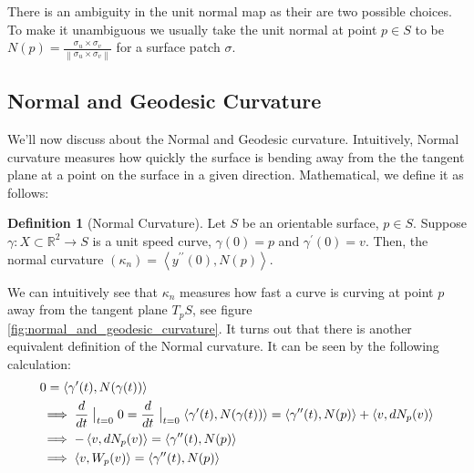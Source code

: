 \documentclass{article}
\theoremstyle{plain}
\theoremstyle{definition}
\newtheorem{definition}{Definition}
\theoremstyle{remark}
\newcommand{\R}{\mathbb{R}}
\begin{document}
There is an ambiguity in the unit normal map as their are two possible choices. To make it unambiguous we usually take the unit normal at point \(p \in S\) to be \( N(p) = \frac{\sigma_u \times \sigma_v}{\left\lVert \sigma_u \times \sigma_v\right\rVert } \) for a surface patch \( \sigma \).

\subsection{Normal and Geodesic Curvature}
We'll now discuss about the Normal and Geodesic curvature. Intuitively, Normal curvature measures how quickly the surface is bending away from the the tangent plane at a point on the surface in a given direction. Mathematical, we define it as follows:

\begin{definition}[Normal Curvature]
    Let \(S\) be an orientable surface, \( p \in S\). Suppose \( \gamma: X \subset \R^2 \rightarrow S\) is a unit speed curve, \( \gamma(0) = p\) and \(\gamma^{\prime}(0) = v\). Then, the normal curvature \(( \kappa_n) = \left\langle y^{\prime \prime}(0), N(p)\right\rangle \).
\end{definition}

We can intuitively see that \(\kappa_n\) measures how fast a curve is curving at point \(p\) away from the tangent plane \(T_pS\), see figure \ref{fig:normal_and_geodesic_curvature}.
It turns out that there is another equivalent definition of the Normal curvature. It can be seen by the following calculation:
\begin{align} \label{eq: relating two interpretaion of the normal curvature}
    \begin{split}
        & 0 = \left\langle \gamma^{\prime}(t) , N(\gamma(t)) \right\rangle \\
        & \implies \frac{d}{dt} \bigm|_{t=0} 0  = \frac{d}{dt} \bigm|_{t=0} \left\langle \gamma^{\prime}(t) , N(\gamma(t)) \right\rangle
        = \left\langle \gamma^{\prime \prime}(t), N(p)\right\rangle + \left\langle v, dN_p(v) \right\rangle \\
        & \implies  - \left\langle v, dN_p(v) \right\rangle  = \left\langle \gamma^{\prime \prime}(t), N(p)\right\rangle \\
        & \implies   \left\langle v, W_p(v) \right\rangle = \left\langle \gamma^{\prime \prime}(t), N(p)\right\rangle
    \end{split}
\end{align}
\end{document}
